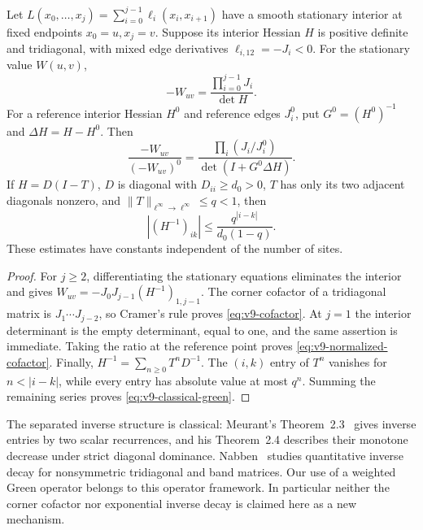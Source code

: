 \begin{proposition}
\label{prop:v9-cofactor}
Let $L(x_0,\ldots,x_j)=\sum_{i=0}^{j-1}\ell_i(x_i,x_{i+1})$
have a smooth stationary interior at fixed endpoints $x_0=u,x_j=v$.
Suppose its interior Hessian $H$ is positive definite and tridiagonal,
with mixed edge derivatives $\ell_{i,12}=-J_i<0$.
For the stationary value $W(u,v)$,
\begin{equation}\label{eq:v9-cofactor}
 -W_{uv}=\frac{\prod_{i=0}^{j-1}J_i}{\det H}.
\end{equation}
For a reference interior Hessian $H^0$ and reference edges $J_i^0$,
put $G^0=(H^0)^{-1}$ and $\Delta H=H-H^0$. Then
\begin{equation}\label{eq:v9-normalized-cofactor}
 \frac{-W_{uv}}{(-W_{uv})^0}
  =\frac{\prod_i(J_i/J_i^0)}{\det(I+G^0\Delta H)}.
\end{equation}
If $H=D(I-T)$, $D$ is diagonal with $D_{ii}\ge d_0>0$,
$T$ has only its two adjacent diagonals nonzero, and
$\|T\|_{\ell^\infty\to\ell^\infty}\le q<1$, then
\begin{equation}\label{eq:v9-classical-green}
 |(H^{-1})_{ik}|\le \frac{q^{|i-k|}}{d_0(1-q)}.
\end{equation}
These estimates have constants independent of the number of sites.
\end{proposition}
\begin{proof}
For $j\ge2$, differentiating the stationary equations eliminates the
interior and gives
$W_{uv}=-J_0J_{j-1}(H^{-1})_{1,j-1}$.
The corner cofactor of a tridiagonal matrix is
$J_1\cdots J_{j-2}$, so Cramer's rule proves
\eqref{eq:v9-cofactor}. At $j=1$ the interior determinant is the
empty determinant, equal to one, and the same assertion is immediate.
Taking the ratio at the reference point proves
\eqref{eq:v9-normalized-cofactor}. Finally,
$H^{-1}=\sum_{n\ge0}T^nD^{-1}$. The $(i,k)$ entry of $T^n$
vanishes for $n<|i-k|$, while every entry has absolute value at most
$q^n$. Summing the remaining series proves
\eqref{eq:v9-classical-green}.
\end{proof}

The separated inverse structure is classical: Meurant's
Theorem~2.3~\cite{Meurant} gives inverse entries by two scalar
recurrences, and his Theorem~2.4 describes their monotone decrease
under strict diagonal dominance. Nabben~\cite{Nabben} studies
quantitative inverse decay for nonsymmetric tridiagonal and band
matrices. Our use of a weighted Green operator belongs to this
operator framework. In particular neither the corner cofactor nor
exponential inverse decay is claimed here as a new mechanism.

